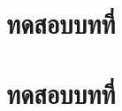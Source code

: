 \documentclass[a4paper,12pt]{book}
\begin{document}
\chapter{ทดสอบบทที่ \thechapter}
\blindtext
\chapter{ทดสอบบทที่ \thechapter}
\blindtext
\end{document}
